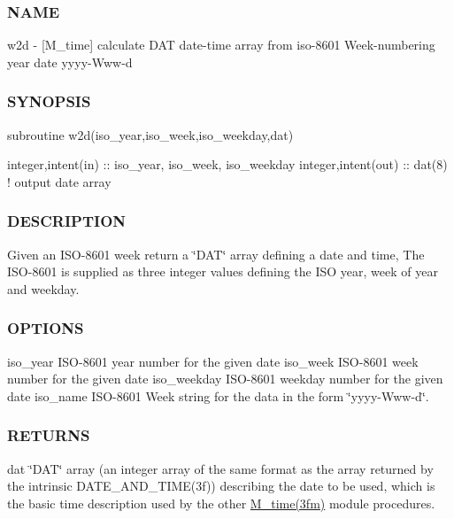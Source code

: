\begin{DoxyVerb}
\subsubsection*{N\+A\+ME}

w2d -\/ \mbox{[}M\+\_\+time\mbox{]} calculate D\+AT date-\/time array from iso-\/8601 Week-\/numbering year date yyyy-\/\+Www-\/d 

\subsubsection*{S\+Y\+N\+O\+P\+S\+IS}

\begin{DoxyVerb}subroutine w2d(iso_year,iso_week,iso_weekday,dat)

 integer,intent(in)      :: iso_year, iso_week, iso_weekday
 integer,intent(out)     :: dat(8)     ! output date array
\end{DoxyVerb}


\subsubsection*{D\+E\+S\+C\+R\+I\+P\+T\+I\+ON}

Given an I\+S\+O-\/8601 week return a \char`\"{}\+D\+A\+T\char`\"{} array defining a date and time, The I\+S\+O-\/8601 is supplied as three integer values defining the I\+SO year, week of year and weekday.

\subsubsection*{O\+P\+T\+I\+O\+NS}

iso\+\_\+year I\+S\+O-\/8601 year number for the given date iso\+\_\+week I\+S\+O-\/8601 week number for the given date iso\+\_\+weekday I\+S\+O-\/8601 weekday number for the given date iso\+\_\+name I\+S\+O-\/8601 Week string for the data in the form \char`\"{}yyyy-\/\+Www-\/d\char`\"{}.

\subsubsection*{R\+E\+T\+U\+R\+NS}

dat \char`\"{}\+D\+A\+T\char`\"{} array (an integer array of the same format as the array returned by the intrinsic D\+A\+T\+E\+\_\+\+A\+N\+D\+\_\+\+T\+I\+M\+E(3f)) describing the date to be used, which is the basic time description used by the other \hyperlink{M__time_83_8txt_a9591ef7ca68b7656bfd5560ed8d81293}{M\+\_\+time(3fm)} module procedures.


\end{DoxyVerb}
